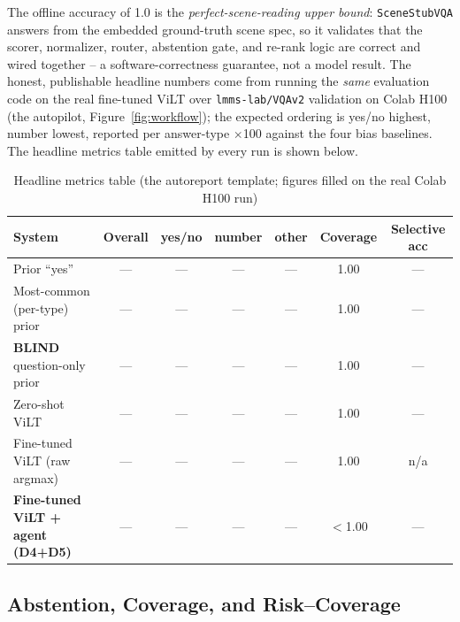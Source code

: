 \documentclass[12pt,a4paper]{article}
\begin{document}
The offline accuracy of 1.0 is the \emph{perfect-scene-reading upper bound}: \texttt{SceneStubVQA} answers from the embedded ground-truth scene spec, so it validates that the scorer, normalizer, router, abstention gate, and re-rank logic are correct and wired together -- a software-correctness guarantee, not a model result. The honest, publishable headline numbers come from running the \emph{same} evaluation code on the real fine-tuned ViLT over \texttt{lmms-lab/VQAv2} validation on Colab H100 (the autopilot, Figure~\ref{fig:workflow}); the expected ordering is yes/no highest, number lowest, reported per answer-type $\times$100 against the four bias baselines. The headline metrics table emitted by every run is shown below.

\begin{table}[H]
\centering
\caption{Headline metrics table (the autoreport template; figures filled on the real Colab H100 run)}
\small
\setlength{\tabcolsep}{4pt}
\begin{tabular}{lcccccc}
\toprule
\textbf{System} & \textbf{Overall} & \textbf{yes/no} & \textbf{number} & \textbf{other} & \textbf{Coverage} & \textbf{Selective acc} \\
\midrule
Prior ``yes'' & --- & --- & --- & --- & 1.00 & --- \\
Most-common (per-type) prior & --- & --- & --- & --- & 1.00 & --- \\
\textbf{BLIND} question-only prior & --- & --- & --- & --- & 1.00 & --- \\
Zero-shot ViLT & --- & --- & --- & --- & 1.00 & --- \\
Fine-tuned ViLT (raw argmax) & --- & --- & --- & --- & 1.00 & n/a \\
\textbf{Fine-tuned ViLT + agent (D4+D5)} & --- & --- & --- & --- & $<$1.00 & --- \\
\bottomrule
\end{tabular}
\end{table}

\subsection{Abstention, Coverage, and Risk--Coverage}
\end{document}
